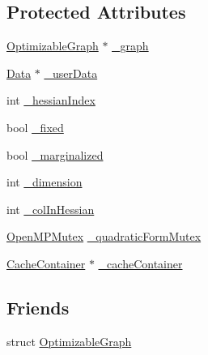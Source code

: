 \subsection*{Protected Attributes}
\begin{DoxyCompactItemize}
\item 
\mbox{\hyperlink{structg2o_1_1_optimizable_graph}{Optimizable\+Graph}} $\ast$ \mbox{\hyperlink{classg2o_1_1_optimizable_graph_1_1_vertex_a6e14fd3ad8e531ead03b4d83cc7362ad}{\+\_\+graph}}
\item 
\mbox{\hyperlink{classg2o_1_1_optimizable_graph_1_1_data}{Data}} $\ast$ \mbox{\hyperlink{classg2o_1_1_optimizable_graph_1_1_vertex_a71eb5fdfaf5c9a442135502e23504500}{\+\_\+user\+Data}}
\item 
int \mbox{\hyperlink{classg2o_1_1_optimizable_graph_1_1_vertex_aebf035f2c8177b5dac1bc650e0f0cf62}{\+\_\+hessian\+Index}}
\item 
bool \mbox{\hyperlink{classg2o_1_1_optimizable_graph_1_1_vertex_af98461471e6b58664a9fc4bba9340501}{\+\_\+fixed}}
\item 
bool \mbox{\hyperlink{classg2o_1_1_optimizable_graph_1_1_vertex_a5e9b3906c8ff800b9a0b16b10ed9fff0}{\+\_\+marginalized}}
\item 
int \mbox{\hyperlink{classg2o_1_1_optimizable_graph_1_1_vertex_ab053ffd8851cd3b0f61576ffd349d68e}{\+\_\+dimension}}
\item 
int \mbox{\hyperlink{classg2o_1_1_optimizable_graph_1_1_vertex_add1f5a0236a175784a824524244f7085}{\+\_\+col\+In\+Hessian}}
\item 
\mbox{\hyperlink{classg2o_1_1_open_m_p_mutex}{Open\+M\+P\+Mutex}} \mbox{\hyperlink{classg2o_1_1_optimizable_graph_1_1_vertex_ab9b85ddb487ad4818bc53e0c00ff7bcc}{\+\_\+quadratic\+Form\+Mutex}}
\item 
\mbox{\hyperlink{classg2o_1_1_cache_container}{Cache\+Container}} $\ast$ \mbox{\hyperlink{classg2o_1_1_optimizable_graph_1_1_vertex_a6eed5b850221cd76f0af46b97860f2e8}{\+\_\+cache\+Container}}
\end{DoxyCompactItemize}
\subsection*{Friends}
\begin{DoxyCompactItemize}
\item 
struct \mbox{\hyperlink{classg2o_1_1_optimizable_graph_1_1_vertex_a45d35331ee3deca38c26d1efb6b961ae}{Optimizable\+Graph}}
\end{DoxyCompactItemize}


